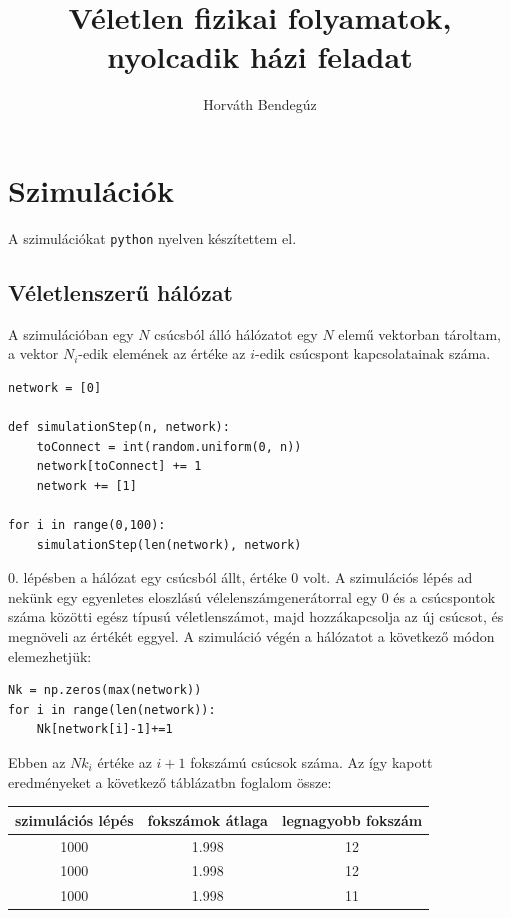 \documentclass[12pt]{article}
\title{Véletlen fizikai folyamatok, nyolcadik házi feladat}
\author{Horváth Bendegúz}
\begin{document}

\maketitle
\section*{Szimulációk}
A szimulációkat \texttt{python} nyelven készítettem el.
\subsection*{Véletlenszerű hálózat}
A szimulációban egy $N$ csúcsból álló hálózatot egy $N$ elemű vektorban tároltam, a vektor $N_i$-edik elemének az értéke az $i$-edik csúcspont kapcsolatainak száma. 
\begin{lstlisting}
network = [0]

def simulationStep(n, network):
    toConnect = int(random.uniform(0, n))
    network[toConnect] += 1
    network += [1]
    
for i in range(0,100):
    simulationStep(len(network), network)

\end{lstlisting}
0. lépésben a hálózat egy csúcsból állt, értéke 0 volt. A szimulációs lépés ad nekünk egy egyenletes eloszlású vélelenszámgenerátorral egy 0 és a csúcspontok száma közötti egész típusú véletlenszámot, majd hozzákapcsolja az új csúcsot, és megnöveli az értékét eggyel.  A szimuláció végén a hálózatot  a következő módon elemezhetjük:
\begin{lstlisting}
Nk = np.zeros(max(network))
for i in range(len(network)):
    Nk[network[i]-1]+=1
\end{lstlisting}
Ebben az $Nk_i$ értéke az $i+1$ fokszámú csúcsok száma.
Az így kapott eredményeket a következő táblázatbn foglalom össze:
\begin{center}
\begin{tabular}{|c|c|c|}\hline
szimulációs lépés& fokszámok átlaga & legnagyobb fokszám\\ \hline
1000&1.998 &12 \\ \hline
1000&1.998 &12 \\ \hline
1000&1.998&11 \\ \hline
\end{tabular}
\end{center} 
\end{document}
